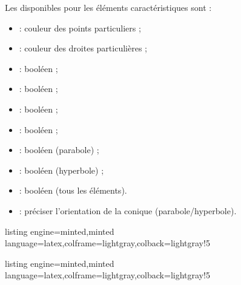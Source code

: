 \documentclass[11pt,a4paper]{ltxdoc}
\begin{document}
Les  disponibles pour les éléments caractéristiques sont :

\begin{itemize}
  \item {} : couleur des points particuliers ;
  \item {} : couleur des droites particulières ;
  \item {} : booléen ;
  \item {} : booléen ;
  \item {} : booléen ;
  \item {} : booléen ;
  \item {} : booléen (parabole) ;
  \item {} : booléen (hyperbole) ;
  \item {} : booléen (tous les éléments).
  \item {} : préciser l'orientation de la conique (parabole/hyperbole).
\end{itemize}

\begin{tcblisting}{listing engine=minted,minted language=latex,colframe=lightgray,colback=lightgray!5}
\begin{GraphiqueTikz}[]
\end{GraphiqueTikz}
\end{tcblisting}

\begin{tcblisting}{listing engine=minted,minted language=latex,colframe=lightgray,colback=lightgray!5}
\begin{GraphiqueTikz}[]
\end{GraphiqueTikz}
\end{tcblisting}
\end{document}
